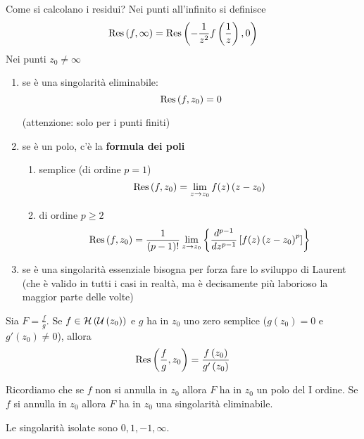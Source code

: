 \begin{rem}
Come si calcolano i residui?
Nei punti all'infinito si definisce
\begin{equation*}
\operatorname{Res} \left(f, \infty \right) = \operatorname{Res} \left(- \frac{1}{z^{2}} f\left(\frac{1}{z}\right), 0\right)
\end{equation*}
Nei punti $z_{0} \neq \infty $
\begin{enumerate}
\item se è una singolarità eliminabile:
\begin{equation*}
\operatorname{Res} \left(f, z_{0}\right) = 0
\end{equation*}

(attenzione: solo per i punti finiti)
\item se è un polo, c'è la \textbf{formula dei poli}
\begin{enumerate}
\item semplice (di ordine $p = 1$)
\begin{equation*}
\operatorname{Res} \left(f, z_{0}\right) = \lim\limits_{z\rightarrow z_{0}} f(z)\left(z - z_{0}\right)
\end{equation*}
\item di ordine $p \geq 2$
\begin{equation*}
\operatorname{Res} \left(f, z_{0}\right) = \frac{1}{\left(p - 1\right) !}\lim\limits_{z\rightarrow z_{0}}\left\{\frac{d^{p - 1}}{dz^{p - 1}}\left[ f(z)\left(z - z_{0}\right)^{p}\right]\right\}
\end{equation*}
\end{enumerate}
\item se è una singolarità essenziale bisogna per forza fare lo sviluppo di Laurent (che è valido in tutti i casi in realtà, ma è decisamente più laborioso la maggior parte delle volte)
\end{enumerate}
\end{rem}
\begin{thm}
Sia $F = \frac{f}{g}$. Se $f\in \mathcal{H} \left(\mathcal{U} \left(z_{0}\right)\right)$ e $g$ ha in $z_{0}$ uno zero semplice ($g\left(z_{0}\right) = 0$ e $g'\left(z_{0}\right) \neq 0$), allora
\begin{equation*}
\operatorname{Res} \left(\frac{f}{g}, z_{0}\right) = \frac{f\left(z_{0}\right)}{g'\left(z_{0}\right)}
\end{equation*}

Ricordiamo che se $f$ non si annulla in $z_{0}$ allora $F$ ha in $z_{0}$ un polo del I ordine. Se $f$ si annulla in $z_{0}$ allora $F$ ha in $z_{0}$ una singolarità eliminabile.
\end{thm}
Le singolarità isolate sono $0, 1, - 1, \infty $.

